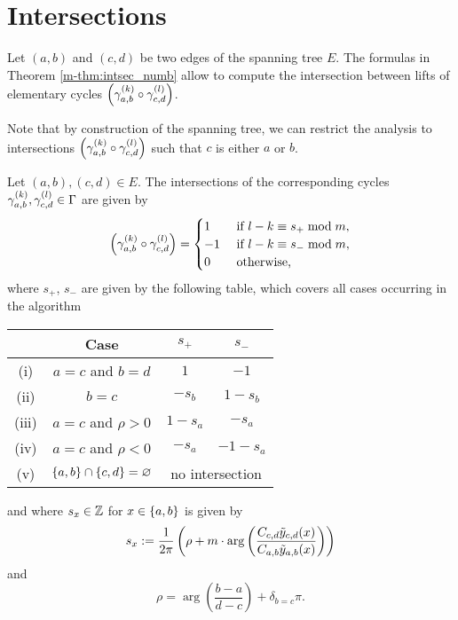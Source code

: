 \documentclass[main.tex]{subfiles}
\begin{document}
  \section{Intersections}\label{sec:intersections}

   Let $(a,b)$ and $(c,d)$ be two edges of the spanning tree $E$.
  The formulas in Theorem \ref{m-thm:intsec_numb} allow to compute the intersection
  between lifts of elementary cycles $\left(\gamma_{a,b}^{(k)} \circ \gamma_{c,d}^{(l)}\right)$.

  Note that by construction of the spanning tree,
  we can restrict the analysis to intersections $\left(\gamma_{a,b}^{(k)} \circ \gamma_{c,d}^{(l)}\right)$
  such that $c$ is either $a$ or $b$.

   \begin{thm}\label{thm:intsec_numb}
      Let $(a,b),(c,d) \in E$. The intersections of the corresponding cycles $\gamma_{a,b}^{(k)}, \gamma_{c,d}^{(l)} \in \Gamma$ are given by
      \begin{equation*}
          \left(\gamma_{a,b}^{(k)} \circ \gamma_{c,d}^{(l)}\right)
          = \begin{cases}
              1  &\text{ if } l-k \equiv s_+ \bmod m,\\
              -1 &\text{ if } l-k \equiv s_- \bmod m,\\
              0 &\text{ otherwise,}
          \end{cases}
      \end{equation*}
      where $s_+$, $s_-$ are given by the following table, which covers all
      cases occurring in the algorithm
      \begin{center}
          \normalfont
      \begin{tabular}{cccc}
          \toprule
          & Case & $s_+$ & $s_-$ \\
          \midrule
         (i) & $a=c$ and $b=d$ & $1$ & $-1$ \\
         (ii) & $b=c$ & $-s_b$ & $1-s_b$ \\
         (iii) & $a=c$ and $\rho>0$ & $1-s_a$ & $-s_a$ \\
         (iv) & $a=c$ and $\rho<0$ & $-s_a$ & $-1-s_a$\\
         (v) & $\left\{a,b\right\}\cap\left\{c,d\right\}=\varnothing$ & \multicolumn{2}{c}{no intersection} \\
          \bottomrule
      \end{tabular}
      \end{center}
      and where $s_x \in \mathbb{Z}$ for $x\in\left\{a,b\right\}$ is given by
      \begin{equation*}\label{eq:s_x}
	    s_x := \frac{1}{2\pi}\left( \rho + m \cdot \arg \left( \frac{C_{c,d} \tilde{y}_{c,d}(x)}{C_{a,b}\tilde{y}_{a,b}(x)} \right)
	    \right)
      \end{equation*}
     and
      \begin{equation*}
          \rho = \arg \left( \frac{b-a}{d-c} \right) + \delta_{b=c}\pi.
      \end{equation*}
 \end{thm}
\end{document}
